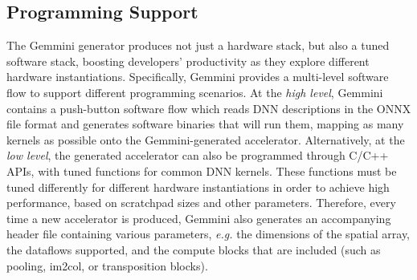 


\subsection{Programming Support}
\label{software}

The Gemmini generator produces not just a hardware stack, but also a tuned software stack, boosting developers' productivity as they explore different hardware instantiations.
Specifically, Gemmini provides a multi-level software flow to support different programming scenarios.
At the \textit{high level}, Gemmini contains a push-button software flow which reads DNN descriptions in the ONNX file format
and generates software binaries that will run them, mapping as many kernels as possible onto the Gemmini-generated accelerator. Alternatively, at the \textit{low level}, the generated accelerator can also be programmed through C/C++ APIs, with tuned functions for common DNN kernels. These functions must be tuned differently for different hardware instantiations in order to achieve high performance, based on scratchpad sizes and other parameters. Therefore, every time a new accelerator is produced, Gemmini also generates an accompanying header file containing various parameters, \textit{e.g.} the dimensions of the spatial array, the dataflows supported, and the compute blocks that are included (such as pooling, im2col, or transposition blocks).


